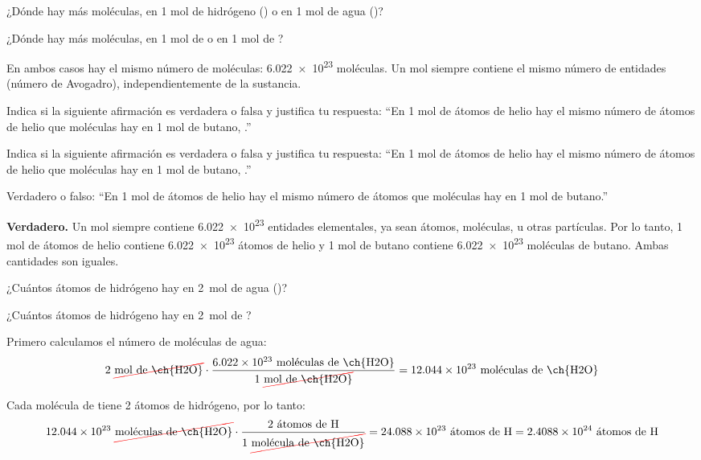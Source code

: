 \begin{exercise}
    ¿Dónde hay más moléculas, en 1 mol de hidrógeno () o en 1 mol de agua ()?
    \begin{solu}
        ¿Dónde hay más moléculas, en 1 mol de  o en 1 mol de ?

        En ambos casos hay el mismo número de moléculas: \num{6.022e23} moléculas. Un mol siempre contiene el mismo número de entidades (número de Avogadro), independientemente de la sustancia.
    \end{solu}
\end{exercise}

\begin{exercise}
    Indica si la siguiente afirmación es verdadera o falsa y justifica tu respuesta:
    ``En 1 mol de átomos de helio hay el mismo número de átomos de helio que moléculas hay en 1 mol de butano, .''
    \begin{solu}
        Indica si la siguiente afirmación es verdadera o falsa y justifica tu respuesta:
        ``En 1 mol de átomos de helio hay el mismo número de átomos de helio que moléculas hay en 1 mol de butano, .''

        Verdadero o falso: ``En 1 mol de átomos de helio hay el mismo número de átomos que moléculas hay en 1 mol de butano.''

        \textbf{Verdadero.} Un mol siempre contiene \num{6.022e23} entidades elementales, ya sean átomos, moléculas, u otras partículas. Por lo tanto, 1 mol de átomos de helio contiene \num{6.022e23} átomos de helio y 1 mol de butano contiene \num{6.022e23} moléculas de butano. Ambas cantidades son iguales.
    \end{solu}
\end{exercise}

\begin{exercise}
    ¿Cuántos átomos de hidrógeno hay en \qty{2}{\mole} de agua ()?
    \begin{solu}
        ¿Cuántos átomos de hidrógeno hay en \qty{2}{\mole} de ?

        Primero calculamos el número de moléculas de agua:
        \begin{equation*}
            2\ \cancelred{\unit{\mole}\ \text{de \ch{H2O}}} \cdot \dfrac{\num{6.022e23}\ \text{moléculas de \ch{H2O}}}{1\ \cancelred{\unit{\mole}\ \text{de \ch{H2O}}}} = \num{12.044e23}\ \text{moléculas de \ch{H2O}}
        \end{equation*}

        Cada molécula de  tiene 2 átomos de hidrógeno, por lo tanto:
        \begin{equation*}
            \num{12.044e23}\ \cancelred{\text{moléculas de \ch{H2O}}} \cdot \dfrac{2\ \text{átomos de H}}{1\ \cancelred{\text{molécula de \ch{H2O}}}} = \num{24.088e23}\ \text{átomos de H} = \num{2.4088e24}\ \text{átomos de H}
        \end{equation*}
    \end{solu}
\end{exercise}


